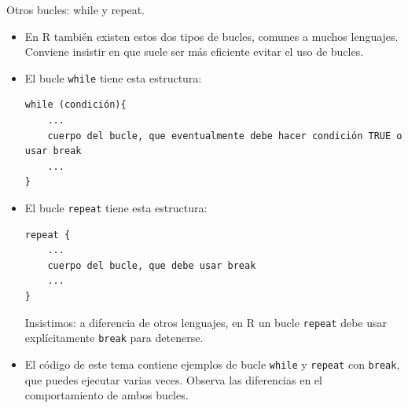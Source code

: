 \documentclass[
  9pt,
  ignorenonframetext,
]{beamer}
\begin{document}
\begin{frame}[fragile]{Otros bucles: while y repeat.}
\protect\hypertarget{otros-bucles-while-y-repeat.}{}

\begin{itemize}
\item
  En R también existen estos dos tipos de bucles, comunes a muchos
  lenguajes. Conviene insistir en que suele ser más eficiente evitar el
  uso de bucles.
\item
  El bucle \texttt{while} tiene esta estructura:\small

\begin{verbatim}
while (condición){
    ...
    cuerpo del bucle, que eventualmente debe hacer condición TRUE o usar break
    ...
}
\end{verbatim}

  \normalsize
\item
  El bucle \texttt{repeat} tiene esta estructura:\small

\begin{verbatim}
repeat {
    ...
    cuerpo del bucle, que debe usar break
    ...
}
\end{verbatim}

  \normalsize Insistimos: a diferencia de otros lenguajes, en R un bucle
  \texttt{repeat} debe usar explícitamente \texttt{break} para
  detenerse.
\item
  El código de este tema contiene ejemplos de bucle \texttt{while} y
  \texttt{repeat} con \texttt{break}, que puedes ejecutar varias veces.
  Observa las diferencias en el comportamiento de ambos bucles.
\end{itemize}

\end{frame}
\end{document}
